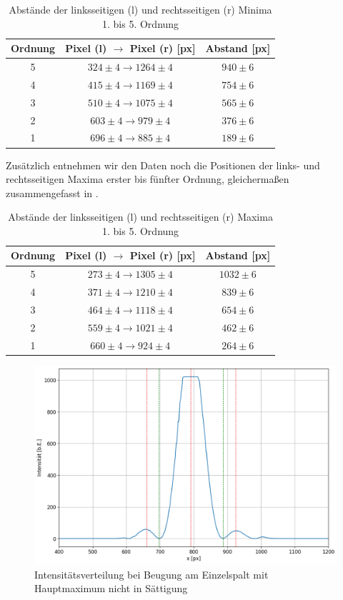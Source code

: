 \begin{table}[H]
  \centering
  \caption{Abstände der linksseitigen (l) und rechtsseitigen (r) Minima 1. bis 5. Ordnung}
  \vspace*{0.5em}
  \begin{tabular}{c|c|c}
    Ordnung & Pixel (l) $\to$ Pixel (r) [px] & Abstand [px]\\\hline
    5 & $324 \pm 4 \to 1264 \pm 4$ & $940 \pm 6$\\
    4 & $415 \pm 4 \to 1169 \pm 4$ & $754 \pm 6$\\
    3 & $510 \pm 4 \to 1075 \pm 4$ & $565 \pm 6$\\
    2 & $603 \pm 4 \to 979 \pm 4$ & $376 \pm 6$\\
    1 & $696 \pm 4 \to 885 \pm 4$ & $189 \pm 6$
  \end{tabular}
  \label{tab:es_abst_minima}
\end{table}

Zusätzlich entnehmen wir den Daten noch die Positionen der links- und rechtsseitigen Maxima erster bis fünfter Ordnung, gleichermaßen zusammengefasst in .

\begin{table}[H]
  \centering
  \caption{Abstände der linksseitigen (l) und rechtsseitigen (r) Maxima 1. bis 5. Ordnung}
  \vspace*{0.5em}
  \begin{tabular}{c|c|c}
    Ordnung & Pixel (l) $\to$ Pixel (r) [px] & Abstand [px]\\\hline
    5 & $273 \pm 4 \to 1305 \pm 4$ & $1032 \pm 6$\\
    4 & $371 \pm 4 \to 1210 \pm 4$ & $839 \pm 6$\\
    3 & $464 \pm 4 \to 1118 \pm 4$ & $654 \pm 6$\\
    2 & $559 \pm 4 \to 1021 \pm 4$ & $462 \pm 6$\\
    1 & $660 \pm 4 \to 924 \pm 4$ & $264 \pm 6$
  \end{tabular}
  \label{tab:es_abst_maxima}
\end{table}

\begin{figure}[H]
  \centering
  \includegraphics[width=.9\textwidth]{files/plots/2/es_nicht_saett_extrema.png}
  \caption{Intensitätsverteilung bei Beugung am Einzelspalt mit Hauptmaximum nicht in Sättigung}
  \label{fig:es_nicht_saett_extrema}
\end{figure}

